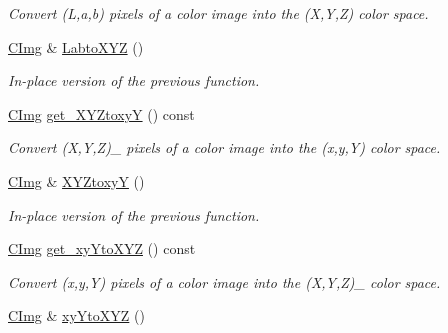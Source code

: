 \begin{DoxyCompactItemize}
\begin{DoxyCompactList}\small\item\em Convert (L,a,b) pixels of a color image into the (X,Y,Z) color space. \end{DoxyCompactList}\item 
\hypertarget{structcimg__library_1_1_c_img_a95c5de084219d3c76ef0e311b2ce75c3}{\hyperlink{structcimg__library_1_1_c_img}{C\-Img} \& \hyperlink{structcimg__library_1_1_c_img_a95c5de084219d3c76ef0e311b2ce75c3}{Labto\-X\-Y\-Z} ()}\label{structcimg__library_1_1_c_img_a95c5de084219d3c76ef0e311b2ce75c3}

\begin{DoxyCompactList}\small\item\em In-\/place version of the previous function. \end{DoxyCompactList}\item 
\hypertarget{structcimg__library_1_1_c_img_a276e01d3ca5089793b270aafd4352303}{\hyperlink{structcimg__library_1_1_c_img}{C\-Img} \hyperlink{structcimg__library_1_1_c_img_a276e01d3ca5089793b270aafd4352303}{get\-\_\-\-X\-Y\-Ztoxy\-Y} () const }\label{structcimg__library_1_1_c_img_a276e01d3ca5089793b270aafd4352303}

\begin{DoxyCompactList}\small\item\em Convert (X,Y,Z)\-\_ pixels of a color image into the (x,y,Y) color space. \end{DoxyCompactList}\item 
\hypertarget{structcimg__library_1_1_c_img_a3dbc3a0638243338884cb8e6d860f1c8}{\hyperlink{structcimg__library_1_1_c_img}{C\-Img} \& \hyperlink{structcimg__library_1_1_c_img_a3dbc3a0638243338884cb8e6d860f1c8}{X\-Y\-Ztoxy\-Y} ()}\label{structcimg__library_1_1_c_img_a3dbc3a0638243338884cb8e6d860f1c8}

\begin{DoxyCompactList}\small\item\em In-\/place version of the previous function. \end{DoxyCompactList}\item 
\hypertarget{structcimg__library_1_1_c_img_aae4127c79997d02c06cb144e429c583b}{\hyperlink{structcimg__library_1_1_c_img}{C\-Img} \hyperlink{structcimg__library_1_1_c_img_aae4127c79997d02c06cb144e429c583b}{get\-\_\-xy\-Yto\-X\-Y\-Z} () const }\label{structcimg__library_1_1_c_img_aae4127c79997d02c06cb144e429c583b}

\begin{DoxyCompactList}\small\item\em Convert (x,y,Y) pixels of a color image into the (X,Y,Z)\-\_ color space. \end{DoxyCompactList}\item 
\hypertarget{structcimg__library_1_1_c_img_aeaa1683d6d9c57dd74791c0bd8fac746}{\hyperlink{structcimg__library_1_1_c_img}{C\-Img} \& \hyperlink{structcimg__library_1_1_c_img_aeaa1683d6d9c57dd74791c0bd8fac746}{xy\-Yto\-X\-Y\-Z} ()}\label{structcimg__library_1_1_c_img_aeaa1683d6d9c57dd74791c0bd8fac746}


\end{DoxyCompactItemize}
